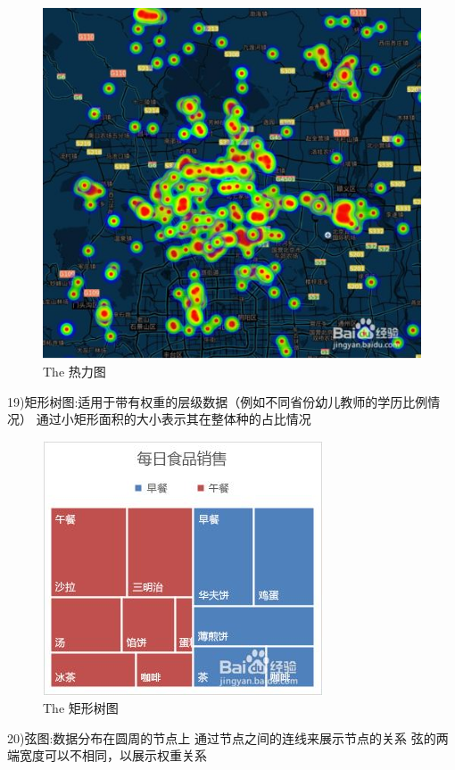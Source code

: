 \documentclass{article}
\begin{document}
\begin{itemize}
\begin{figure}[h!]
    			\includegraphics[scale=0.7]{re}
    			\caption{The 热力图}
    			\label{fig:re}
    		\end{figure}
    		19)矩形树图:适用于带有权重的层级数据（例如不同省份幼儿教师的学历比例情况）
    		通过小矩形面积的大小表示其在整体种的占比情况	\par
    		\begin{figure}[h!]
    			\centering
    			\includegraphics[scale=0.7]{ju}
    			\caption{The 矩形树图}
    			\label{fig:ju}
    		\end{figure}
    		20)弦图:数据分布在圆周的节点上
    		通过节点之间的连线来展示节点的关系
    		弦的两端宽度可以不相同，以展示权重关系\par
    		\begin{figure}[h!]

\end{figure}
\end{itemize}
\end{document}

